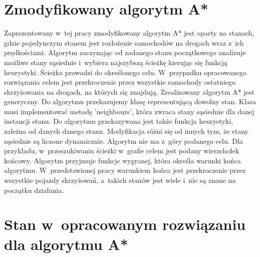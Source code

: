 \section{Zmodyfikowany algorytm A*}

Zaprezentowany w~tej pracy zmodyfikowany algorytm A* jest oparty na stanach, gdzie pojedynczym stanem jest rozłożenie samochodów na drogach wraz z~ich prędkościami. Algorytm zaczynając od zadanego stanu początkowego analizuje możliwe stany sąsiednie i~wybiera najszybszą ścieżkę kierując się funkcją heurystyki. Ścieżka prowadzi do określonego celu. W~przypadku opracowanego rozwiązania celem jest przekroczenie przez wszystkie samochody ostatniego skrzyżowania na drogach, na których się znajdują.
\newline
\indent
Zrealizowany algorytm A* jest generyczny. Do algorytmu przekazujemy klasę reprezentującą dowolny stan. Klasa musi implementować metodę 'neighbours', która zwraca stany sąsiednie dla danej instancji stanu. Do algorytmu przekazywana jest także funkcja heurystyki, zależna od danych danego stanu.
\newline
\indent
Modyfikacja różni się od innych tym, że stany sąsiednie są liczone dynamicznie. Algorytm nie ma z~góry podanego celu. Dla przykładu, w~przeszukiwaniu ścieżki w~grafie celem jest podany wierzchołek końcowy. Algorytm przyjmuje funkcje wygranej, która określa warunki końca algorytmu. W~przedstawionej pracy warunkiem końca jest przekroczenie przez wszystkie pojazdy skrzyżowań, a~takich stanów jest wiele i~nie są znane na początku działania.

\section{Stan w~opracowanym rozwiązaniu dla algorytmu A*}

